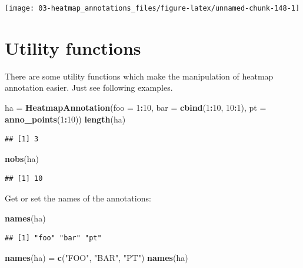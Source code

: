 \documentclass[]{book}
\newenvironment{Shaded}{\begin{snugshade}}{\end{snugshade}}
\newcommand{\KeywordTok}[1]{\textcolor[rgb]{0.13,0.29,0.53}{\textbf{#1}}}
\newcommand{\DataTypeTok}[1]{\textcolor[rgb]{0.13,0.29,0.53}{#1}}
\newcommand{\DecValTok}[1]{\textcolor[rgb]{0.00,0.00,0.81}{#1}}
\newcommand{\StringTok}[1]{\textcolor[rgb]{0.31,0.60,0.02}{#1}}
\newcommand{\OperatorTok}[1]{\textcolor[rgb]{0.81,0.36,0.00}{\textbf{#1}}}
\newcommand{\NormalTok}[1]{#1}
\theoremstyle{definition}
\theoremstyle{definition}
\theoremstyle{definition}
\theoremstyle{remark}
\begin{document}
\begin{center}\texttt{[image: 03-heatmap\_annotations\_files/figure-latex/unnamed-chunk-148-1]} \end{center}

\section{Utility functions}\label{heatmap-annotation-utility-function}

There are some utility functions which make the manipulation of heatmap
annotation easier. Just see following examples.

\begin{Shaded}
\begin{Highlighting}[]
\NormalTok{ha =}\StringTok{ }\KeywordTok{HeatmapAnnotation}\NormalTok{(}\DataTypeTok{foo =} \DecValTok{1}\OperatorTok{:}\DecValTok{10}\NormalTok{, }
    \DataTypeTok{bar =} \KeywordTok{cbind}\NormalTok{(}\DecValTok{1}\OperatorTok{:}\DecValTok{10}\NormalTok{, }\DecValTok{10}\OperatorTok{:}\DecValTok{1}\NormalTok{),}
    \DataTypeTok{pt =} \KeywordTok{anno_points}\NormalTok{(}\DecValTok{1}\OperatorTok{:}\DecValTok{10}\NormalTok{))}
\KeywordTok{length}\NormalTok{(ha)}
\end{Highlighting}
\end{Shaded}

\begin{verbatim}
## [1] 3
\end{verbatim}

\begin{Shaded}
\begin{Highlighting}[]
\KeywordTok{nobs}\NormalTok{(ha)}
\end{Highlighting}
\end{Shaded}

\begin{verbatim}
## [1] 10
\end{verbatim}

Get or set the names of the annotations:

\begin{Shaded}
\begin{Highlighting}[]
\KeywordTok{names}\NormalTok{(ha)}
\end{Highlighting}
\end{Shaded}

\begin{verbatim}
## [1] "foo" "bar" "pt"
\end{verbatim}

\begin{Shaded}
\begin{Highlighting}[]
\KeywordTok{names}\NormalTok{(ha) =}\StringTok{ }\KeywordTok{c}\NormalTok{(}\StringTok{"FOO"}\NormalTok{, }\StringTok{"BAR"}\NormalTok{, }\StringTok{"PT"}\NormalTok{)}
\KeywordTok{names}\NormalTok{(ha)}
\end{Highlighting}
\end{Shaded}
\end{document}
